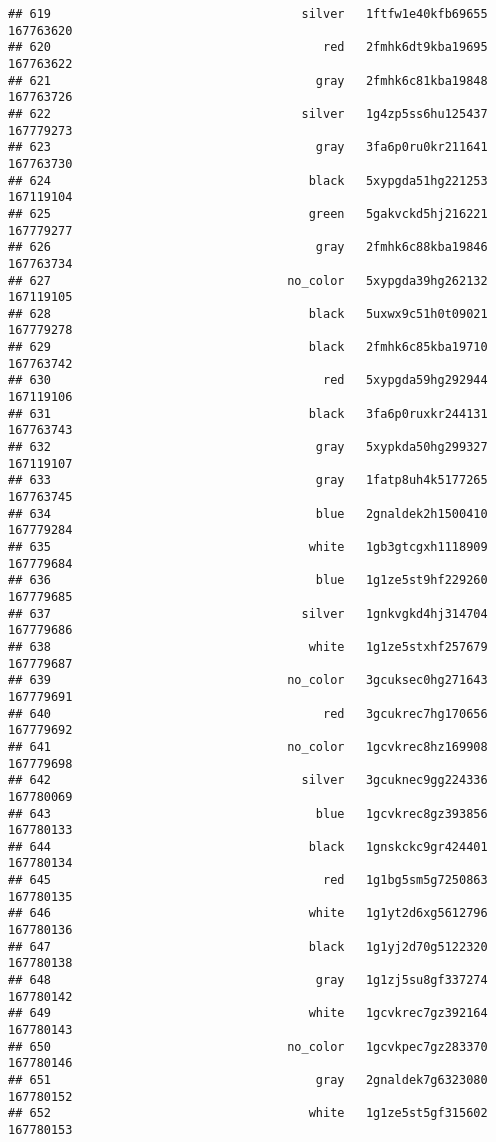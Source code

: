 \documentclass[
]{article}
\begin{document}
\begin{verbatim}
## 619                                   silver   1ftfw1e40kfb69655 167763620
## 620                                      red   2fmhk6dt9kba19695 167763622
## 621                                     gray   2fmhk6c81kba19848 167763726
## 622                                   silver   1g4zp5ss6hu125437 167779273
## 623                                     gray   3fa6p0ru0kr211641 167763730
## 624                                    black   5xypgda51hg221253 167119104
## 625                                    green   5gakvckd5hj216221 167779277
## 626                                     gray   2fmhk6c88kba19846 167763734
## 627                                 no_color   5xypgda39hg262132 167119105
## 628                                    black   5uxwx9c51h0t09021 167779278
## 629                                    black   2fmhk6c85kba19710 167763742
## 630                                      red   5xypgda59hg292944 167119106
## 631                                    black   3fa6p0ruxkr244131 167763743
## 632                                     gray   5xypkda50hg299327 167119107
## 633                                     gray   1fatp8uh4k5177265 167763745
## 634                                     blue   2gnaldek2h1500410 167779284
## 635                                    white   1gb3gtcgxh1118909 167779684
## 636                                     blue   1g1ze5st9hf229260 167779685
## 637                                   silver   1gnkvgkd4hj314704 167779686
## 638                                    white   1g1ze5stxhf257679 167779687
## 639                                 no_color   3gcuksec0hg271643 167779691
## 640                                      red   3gcukrec7hg170656 167779692
## 641                                 no_color   1gcvkrec8hz169908 167779698
## 642                                   silver   3gcuknec9gg224336 167780069
## 643                                     blue   1gcvkrec8gz393856 167780133
## 644                                    black   1gnskckc9gr424401 167780134
## 645                                      red   1g1bg5sm5g7250863 167780135
## 646                                    white   1g1yt2d6xg5612796 167780136
## 647                                    black   1g1yj2d70g5122320 167780138
## 648                                     gray   1g1zj5su8gf337274 167780142
## 649                                    white   1gcvkrec7gz392164 167780143
## 650                                 no_color   1gcvkpec7gz283370 167780146
## 651                                     gray   2gnaldek7g6323080 167780152
## 652                                    white   1g1ze5st5gf315602 167780153

\end{verbatim}
\end{document}
